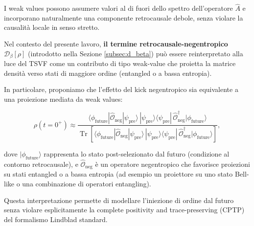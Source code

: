 \documentclass[11pt,a4paper]{article}
\let\oldref\ref
\renewcommand{\ref}{\protect\oldref}
\theoremstyle{plain}
\theoremstyle{definition}
\begin{document}
\vspace{0.2cm}

I weak values possono assumere valori al di fuori dello spettro dell’operatore $\hat{A}$ e incorporano naturalmente una componente retrocausale debole, senza violare la causalità locale in senso stretto.

\vspace{0.3cm}

Nel contesto del presente lavoro, \textbf{il termine retrocausale-negentropico $\mathcal{D}_\beta[\rho]$} (introdotto nella Sezione \ref{subsec:d_beta}) può essere reinterpretato alla luce del TSVF come un contributo di tipo weak-value che proietta la matrice densità verso stati di maggiore ordine (entangled o a bassa entropia). 



\vspace{0.3cm}




In particolare, proponiamo che l’effetto del kick negentropico sia equivalente a una proiezione mediata da weak values:

\vspace{0.2cm}

\begin{equation}
\rho(t=0^+) \approx \frac{\langle \phi_{\text{future}} | \hat{\mathcal{O}}_{\text{neg}} | \psi_{\text{pre}} \rangle \, 
|\psi_{\text{pre}}\rangle\langle \psi_{\text{pre}}| \, 
\hat{\mathcal{O}}_{\text{neg}}^\dagger |\phi_{\text{future}}\rangle}
{\operatorname{Tr}\left[ \langle \phi_{\text{future}} | \hat{\mathcal{O}}_{\text{neg}} | \psi_{\text{pre}} \rangle \, 
|\psi_{\text{pre}}\rangle\langle \psi_{\text{pre}}| \, 
\hat{\mathcal{O}}_{\text{neg}}^\dagger |\phi_{\text{future}}\rangle \right]},
\label{eq:retro_projection_tsvf}
\end{equation}



\vspace{0.3cm}
dove $|\phi_{\text{future}}\rangle$ rappresenta lo stato post-selezionato dal futuro (condizione al contorno retrocausale), e $\hat{\mathcal{O}}_{\text{neg}}$ è un operatore negentropico che favorisce proiezioni su stati entangled o a bassa entropia (ad esempio un proiettore su uno stato Bell-like o una combinazione di operatori entangling).


\vspace{0.3cm}

Questa interpretazione permette di modellare l’iniezione di ordine dal futuro senza violare esplicitamente la complete positivity and trace-preserving (CPTP) del formalismo Lindblad standard. 
\end{document}
